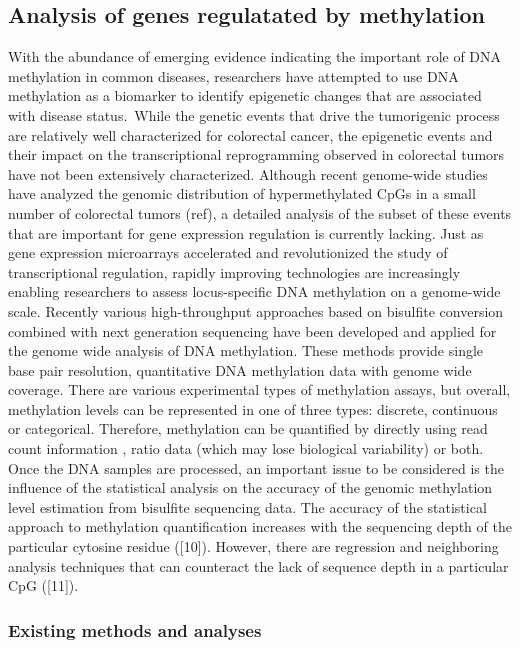 \documentclass[10pt,letterpaper]{article}
\begin{document}
\hypertarget{analysis-of-genes-regulatated-by-methylation}{%
\subsection{Analysis of genes regulatated by
methylation}\label{analysis-of-genes-regulatated-by-methylation}}

With the abundance of emerging evidence indicating the important role of
DNA methylation in common diseases, researchers have attempted to use
DNA methylation as a biomarker to identify epigenetic changes that are
associated with disease status.~While the genetic events that drive the
tumorigenic process are relatively well characterized for colorectal
cancer, the epigenetic events and their impact on the transcriptional
reprogramming observed in colorectal tumors have not been extensively
characterized. Although recent genome-wide studies have analyzed the
genomic distribution of hypermethylated CpGs in a small number of
colorectal tumors (ref), a detailed analysis of the subset of these
events that are important for gene expression regulation is currently
lacking. Just as gene expression microarrays accelerated and
revolutionized the study of transcriptional regulation, rapidly
improving technologies are increasingly enabling researchers to assess
locus-specific DNA methylation on a genome-wide scale. Recently various
high-throughput approaches based on bisulfite conversion combined with
next generation sequencing have been developed and applied for the
genome wide analysis of DNA methylation. These methods provide single
base pair resolution, quantitative DNA methylation data with genome wide
coverage. There are various experimental types of methylation assays,
but overall, methylation levels can be represented in one of three
types: discrete, continuous or categorical. Therefore, methylation can
be quantified by directly using read count information , ratio data
(which may lose biological variability) or both. Once the DNA samples
are processed, an important issue to be considered is the influence of
the statistical analysis on the accuracy of the genomic methylation
level estimation from bisulfite sequencing data. The accuracy of the
statistical approach to methylation quantification increases with the
sequencing depth of the particular cytosine residue ({[}10{]}). However,
there are regression and neighboring analysis techniques that can
counteract the lack of sequence depth in a particular CpG ({[}11{]}).

\hypertarget{existing-methods-and-analyses}{%
\subsubsection{Existing methods and
analyses}\label{existing-methods-and-analyses}}
\end{document}
